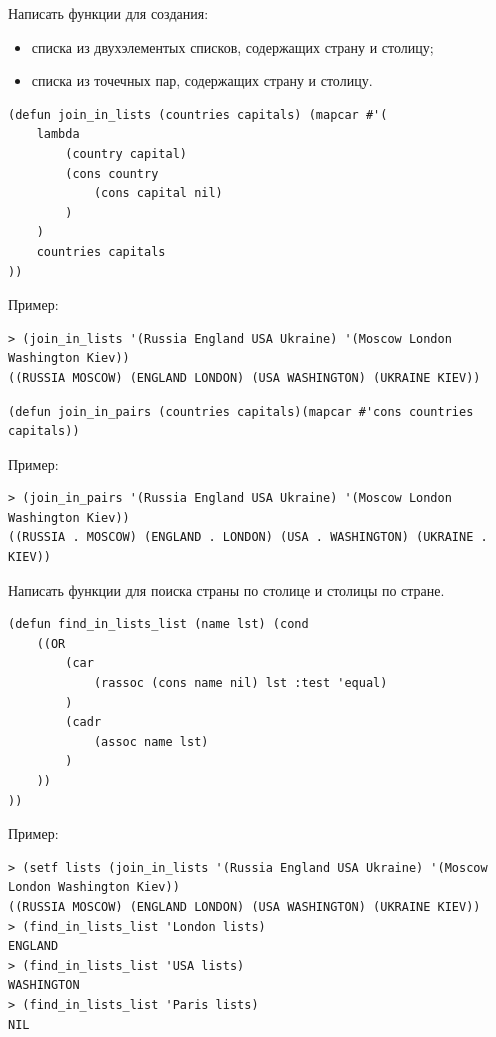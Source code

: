 Написать функции для создания:
\begin{itemize}
\item списка из двухэлементых списков, содержащих страну и столицу;
\item списка из точечных пар, содержащих страну и столицу.
\end{itemize}

\begin{lstlisting}[caption=Функция создания списка из двухэлементных списков]
(defun join_in_lists (countries capitals) (mapcar #'(
	lambda 
		(country capital)
		(cons country 
			(cons capital nil)
		)
	) 
	countries capitals
))
\end{lstlisting}

\newpage
\vspace*{10mm}

Пример:
\begin{lstlisting}
> (join_in_lists '(Russia England USA Ukraine) '(Moscow London Washington Kiev))
((RUSSIA MOSCOW) (ENGLAND LONDON) (USA WASHINGTON) (UKRAINE KIEV))
\end{lstlisting}

\begin{lstlisting}[caption=Функция создания списка из точечных пар]
(defun join_in_pairs (countries capitals)(mapcar #'cons countries capitals))
\end{lstlisting}

Пример:
\begin{lstlisting}
> (join_in_pairs '(Russia England USA Ukraine) '(Moscow London Washington Kiev))
((RUSSIA . MOSCOW) (ENGLAND . LONDON) (USA . WASHINGTON) (UKRAINE . KIEV))
\end{lstlisting}

Написать функции для поиска страны по столице и столицы по стране.

\begin{lstlisting}[caption=Функция поиска в списке двухэлементных списков]
(defun find_in_lists_list (name lst) (cond 
	((OR
		(car 
			(rassoc (cons name nil) lst :test 'equal)
		)
		(cadr
			(assoc name lst)
		)
	))
))
\end{lstlisting}
Пример:

\begin{lstlisting}
> (setf lists (join_in_lists '(Russia England USA Ukraine) '(Moscow London Washington Kiev))
((RUSSIA MOSCOW) (ENGLAND LONDON) (USA WASHINGTON) (UKRAINE KIEV))
> (find_in_lists_list 'London lists)
ENGLAND
> (find_in_lists_list 'USA lists)
WASHINGTON
> (find_in_lists_list 'Paris lists)
NIL
\end{lstlisting}


